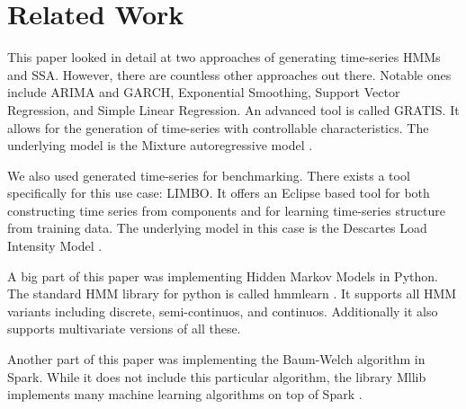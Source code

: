 \chapter{Related Work}\label{chapter:related}

This paper looked in detail at two approaches of generating time-series HMMs and SSA. However, there are countless other approaches out there. Notable ones include ARIMA and GARCH, Exponential Smoothing, Support Vector Regression, and Simple Linear Regression\parencite{inproceedings}. An advanced tool is called GRATIS. It allows for the generation of time-series with controllable characteristics. The underlying model is the Mixture autoregressive model \parencite{kang2019gratis}.

We also used generated time-series for benchmarking. There exists a tool specifically for this use case: LIMBO. It offers an Eclipse based tool for both constructing time series from components and for learning time-series structure from training data. The underlying model in this case is the Descartes Load Intensity Model \parencite{v2014limbo}.

A big part of this paper was implementing Hidden Markov Models in Python. The standard HMM library for python is called hmmlearn \parencite{weiss2019hmmlearn}. It supports all HMM variants including discrete, semi-continuos, and continuos. Additionally it also supports multivariate versions of all these. 

Another part of this paper was implementing the Baum-Welch algorithm in Spark. While it does not include this particular algorithm, the library Mllib implements many machine learning algorithms on top of Spark \parencite{meng2016mllib}.